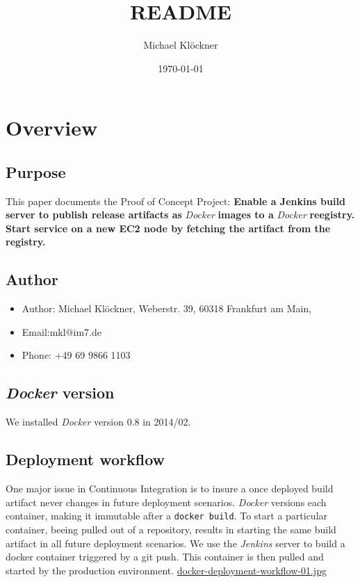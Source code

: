 \documentclass[11pt]{article}
\title{README}
\author{Michael Klöckner}
\date{\today}
\begin{document}
\maketitle

\setcounter{tocdepth}{3}
\tableofcontents
\vspace*{1cm}


\section{Overview}
\label{sec-1}
\subsection{Purpose}
\label{sec-1-1}

This paper documents the Proof of Concept Project:
\textbf{Enable a Jenkins build server to publish release artifacts as} \emph{Docker} \textbf{images to a} \emph{Docker} \textbf{reegistry. Start service on a new EC2 node by fetching the artifact from the registry.}
\subsection{Author}
\label{sec-1-2}

\begin{itemize}
\item Author: Michael Klöckner, Weberstr. 39, 60318 Frankfurt am Main,
\item Email:mkl@im7.de
\item Phone: +49 69 9866 1103
\end{itemize}
\subsection{\emph{Docker} version}
\label{sec-1-3}

   We installed \emph{Docker} version 0.8 in 2014/02.
\subsection{Deployment workflow}
\label{sec-1-4}

One major issue in Continuous Integration is to insure a once deployed build artifact never changes in future deployment scenarios. \emph{Docker} versions each container, making it immutable after a \texttt{docker build}. To start a particular container, beeing pulled out of a repository, results in starting the same build artifact in all future deployment scenarios. We use the \emph{Jenkins} server to build a docker container triggered by a git push. This container is then pulled and started by the production environment.
\href{file:///debiandata/michael/elemica/docker/poc-docker-jenkins/img/docker-deployment-workflow-01.jpg}{docker-deployment-workflow-01.jpg}
\end{document}
